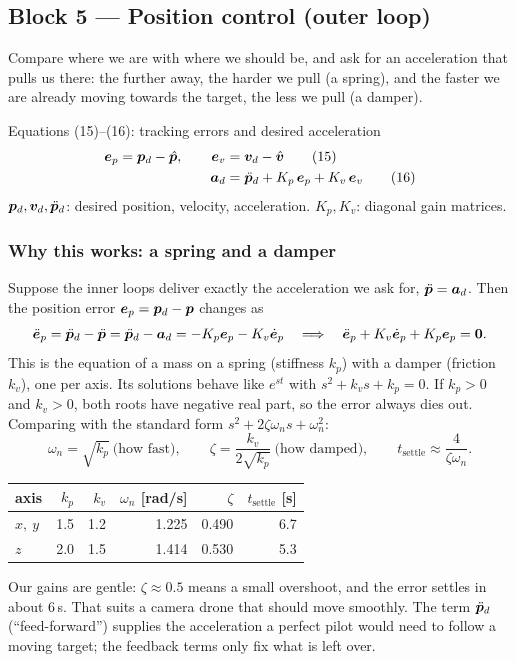 \subsection{Block 5 --- Position control (outer loop)}
\label{sec:m1b5}

\begin{idea}
Compare where we are with where we should be, and ask for an acceleration that pulls us there: the further away,
the harder we pull (a spring), and the faster we are already moving towards the target, the less we pull (a damper).
\end{idea}

\begin{eqbox}{Equations (15)--(16): tracking errors and desired acceleration}
\begin{align}
  \bm{e}_p=\bm{p}_d-\hat{\bm p},\qquad \bm{e}_v&=\bm{v}_d-\hat{\bm v} \tag{15}\label{eq:15}\\
  \bm{a}_d&=\ddot{\bm{p}}_d+K_p\,\bm{e}_p+K_v\,\bm{e}_v \tag{16}\label{eq:16}
\end{align}
$\bm{p}_d,\bm{v}_d,\ddot{\bm{p}}_d$: desired position, velocity, acceleration. $K_p,K_v$: diagonal gain matrices.
\end{eqbox}

\subsubsection*{Why this works: a spring and a damper}
Suppose the inner loops deliver exactly the acceleration we ask for, $\ddot{\bm{p}}=\bm{a}_d$. Then the position error
$\bm{e}_p=\bm{p}_d-\bm{p}$ changes as
\[
\ddot{\bm{e}}_p=\ddot{\bm{p}}_d-\ddot{\bm{p}}=\ddot{\bm{p}}_d-\bm{a}_d=-K_p\bm{e}_p-K_v\dot{\bm{e}}_p
\quad\Longrightarrow\quad \ddot{\bm{e}}_p+K_v\dot{\bm{e}}_p+K_p\bm{e}_p=\bm0 .
\]
This is the equation of a mass on a spring (stiffness $k_p$) with a damper (friction $k_v$), one per axis. Its
solutions behave like $e^{st}$ with $s^2+k_vs+k_p=0$. If $k_p>0$ and $k_v>0$, both roots have negative real part, so the
error always dies out. Comparing with the standard form $s^2+2\zeta\omega_ns+\omega_n^2$:
\[
\omega_n=\sqrt{k_p}\ \text{(how fast)},\qquad \zeta=\frac{k_v}{2\sqrt{k_p}}\ \text{(how damped)},\qquad t_{\text{settle}}\approx\frac{4}{\zeta\omega_n}.
\]
\begin{center}\small
\begin{tabular}{@{}lrrrrr@{}}
\toprule
axis & $k_p$ & $k_v$ & $\omega_n$ [rad/s] & $\zeta$ & $t_{\text{settle}}$ [s]\\
\midrule
$x,\ y$ & 1.5 & 1.2 & 1.225 & 0.490 & 6.7\\
$z$ & 2.0 & 1.5 & 1.414 & 0.530 & 5.3\\
\bottomrule
\end{tabular}
\end{center}
Our  gains are gentle: $\zeta\approx0.5$ means a small overshoot, and the error settles in
about 6\,s. That suits a camera drone that should move smoothly. The term $\ddot{\bm{p}}_d$ (``feed-forward'') supplies the
acceleration a perfect pilot would need to follow a moving target; the feedback terms only fix what is left over.

